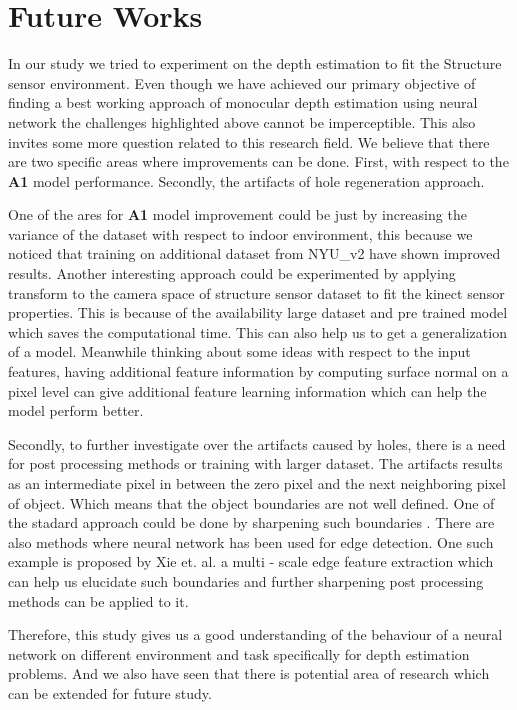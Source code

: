 

\chapter{Future Works}

\label{Chapter8:FutureWorks}

In our study we tried to experiment on the depth estimation to fit the Structure sensor environment. Even though we have achieved our primary objective of finding a best working approach of monocular depth estimation using neural network the challenges highlighted above cannot be imperceptible. This also invites some more question related to this research field.  We believe that there are two specific areas where improvements can be done. First, with respect to the \textbf{A1} model performance. Secondly, the artifacts of hole regeneration approach.

One of the ares for \textbf{A1} model improvement could be just by increasing the variance of the dataset with respect to indoor environment, this because we noticed that training on additional dataset from NYU\_v2 have shown improved results. Another interesting approach could be experimented by applying transform to the camera space of structure sensor dataset to fit the kinect sensor properties. This is because of the availability large dataset and pre trained model which saves the computational time. This can also help us to get a generalization of a model. Meanwhile thinking about some ideas with respect to the input features, having additional feature information by computing surface normal on a pixel level can give additional feature learning information which can help the model perform better. 

Secondly, to further investigate over the artifacts caused by holes, there is a need for post processing methods or training with larger dataset. The artifacts results as an intermediate pixel in between the zero pixel and the next neighboring pixel of object. Which means that the object boundaries are not well defined. One of the stadard approach could be done by sharpening such boundaries  \cite{gui2011image}. There are also methods where neural network has been used for edge detection. One such example is proposed by Xie et. al. a multi - scale edge feature extraction \cite{xie2015holistically} which can help us elucidate such boundaries and further sharpening post processing methods can be applied to it.

Therefore, this study gives us a good understanding of the behaviour of a neural network on different environment and task specifically for depth estimation problems. And we also have seen that there is potential area of research which can be extended for future study. 